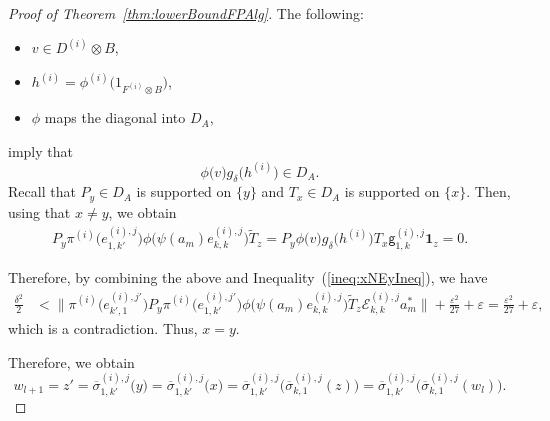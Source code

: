 \documentclass[10pt,a4paper]{amsart}
\newcommand{\Ecal}{\mathcal{E}}
\newcommand{\e}{\varepsilon}
\newcommand{\gUnMatImg}[3]{{ \mathsf{g}_{#3}^{(#1), #2}}}
\newcommand{\indF}{\mathbf{1}}
\newcommand{\normBig}[1]{{\Big\lVert #1 \Big \rVert}}
\newcommand{\prn}[1]{{(#1)}}
\newcommand{\unMatImg}[3]{{\Ecal_{#3}^{(#1), #2}}}
\begin{document}
\begin{proof}[Proof of Theorem~\ref{thm:lowerBoundFPAlg}]
        The following:
        \begin{itemize}
            \item ${v \in D^{\prn{i}} \otimes B}$,
            \item ${h^{(i)} = \phi^{(i)} \big( 1_{F^{(i)} \otimes B} \big)}$,
            \item $\phi$ maps the diagonal into $D_A$,
        \end{itemize}
        imply that 
         \[{{\phi}\big( v \big)   g_\delta\big(h^{(i)}\big) \in D_A}.\]
        Recall that ${P_y \in D_A}$ is supported on $\{y\}$ and ${T_x \in D_A}$ is supported on $\{x\}$. 
        Then, using that ${x \ne y}$, we obtain
        \begin{align*}
            P_y \pi^{(i)}\big(e^{\prn{i},j}_{1,k'} \big) {\phi}\big({\psi}(a_m) e_{k,k}^{(i),j} \big)   \widetilde{T}_{z}
            = P_y {\phi}\big( v \big)   g_\delta\big(h^{(i)}\big) T_x \gUnMatImg{i}{j}{1,k}  \indF_{z} = 0.
        \end{align*}
          
         Therefore, by combining the above and
         Inequality~(\ref{ineq:xNEyIneq}), we have
         \begin{align*}
          \frac{\delta^2}{2}
           & <  \normBig{\pi^{(i)}\big(e^{\prn{i},j'}_{k',1} \big)  P_y \pi^{(i)}\big(e^{\prn{i},j'}_{1,k'} \big) {\phi}\big({\psi}(a_m) e_{k,k}^{(i),j} \big)   \widetilde{T}_{z} \unMatImg{i}{j}{k,k} a_m^\ast} + \frac{\e^2}{27} +\e
           = \frac{\e^2}{27} +\e,
        \end{align*}
        which is a contradiction. 
        Thus, $x=y$.
  
         Therefore, we obtain
         \begin{equation} \label{eq:LowerBoundProof1}
                w_{l+1} = z' 
         ={\overline{\sigma}_{1,k'}^{(i),j}}\big(y \big)
        = {\overline{\sigma}_{1,k'}^{(i),j}}\big(x \big)
        = {\overline{\sigma}_{1,k'}^{(i),j}}\big({{\overline{\sigma}}_{k,1}^{(i),j}}(z) \big)
        = {\overline{\sigma}_{1,k'}^{(i),j}}\big({{\overline{\sigma}}_{k,1}^{(i),j}}(w_l) \big). 
         \end{equation}


\end{proof}
\end{document}
